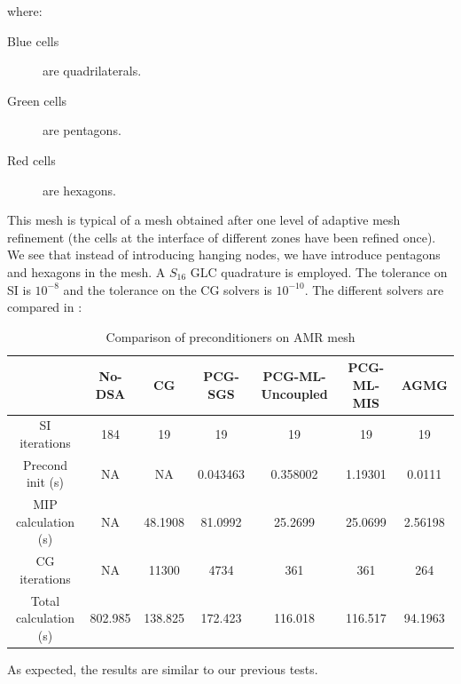 where:
\begin{description}
  \item[Blue cells] are quadrilaterals.
  \item[Green cells] are pentagons.
  \item[Red cells] are hexagons.
\end{description}
This mesh is typical of a mesh obtained after one level of adaptive mesh
refinement (the cells at the interface of different zones have been refined
once). We see that instead of introducing hanging nodes, we have introduce
pentagons and hexagons in the mesh.
A $S_{16}$ GLC quadrature is employed. The tolerance on SI is $10^{-8}$ and
the tolerance on the CG solvers is $10^{-10}$.
The different solvers are compared in :
\begin{table}[H]
  \caption{Comparison of preconditioners on AMR mesh}
  \begin{center}
    \begin{tabular}{|c|c|c|c|c|c|c|}
      \hline
       & No-DSA & CG & PCG-SGS & PCG-ML-Uncoupled & PCG-ML-MIS & AGMG \\
      \hline
   SI iterations & 184     & 19      & 19       & 19      & 19       & 19 \\
Precond init (s) & NA      & NA      & 0.043463 & 0.358002 & 1.19301 & 0.0111\\
MIP calculation (s) & NA   & 48.1908 & 81.0992  & 25.2699 & 25.0699  & 
      2.56198\\
   CG iterations & NA      & 11300   & 4734     & 361     & 361      & 264 \\
     Total calculation (s) & 802.985 & 138.825 & 172.423  & 116.018 & 116.517  &
      94.1963\\
      \hline
    \end{tabular}
    \label{table_amr}
  \end{center}
\end{table}
As expected, the results are similar to our previous tests.

